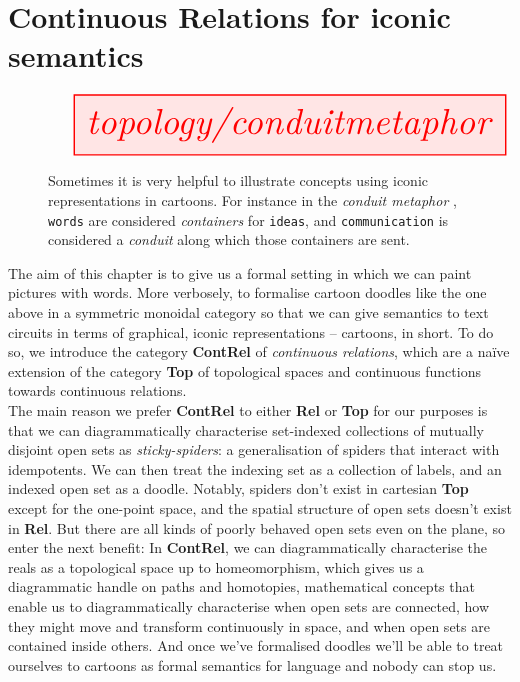 \section{Continuous Relations for iconic semantics}\label{sec:contrelintro}

\begin{figure}[h!]
\centering
\[\resizebox{\textwidth}{!}{\tikzfig{topology/conduitmetaphor}}\]
\caption{Sometimes it is very helpful to illustrate concepts using iconic representations in cartoons. For instance in the \emph{conduit metaphor} \citep{reddyConduitMetaphorCase}, \texttt{words} are considered \emph{containers} for \texttt{ideas}, and \texttt{communication} is considered a \emph{conduit} along which those containers are sent.}
\end{figure}

The aim of this chapter is to give us a formal setting in which we can paint pictures with words. More verbosely, to formalise cartoon doodles like the one above in a symmetric monoidal category so that we can give semantics to text circuits in terms of graphical, iconic representations -- cartoons, in short. To do so, we introduce the category \textbf{ContRel} of \emph{continuous relations}, which are a na\"{i}ve extension of the category \textbf{Top} of topological spaces and continuous functions towards continuous relations.\\

The main reason we prefer \textbf{ContRel} to either \textbf{Rel} or \textbf{Top} for our purposes is that we can diagrammatically characterise set-indexed collections of mutually disjoint open sets as \emph{sticky-spiders}: a generalisation of spiders that interact with idempotents. We can then treat the indexing set as a collection of labels, and an indexed open set as a doodle. Notably, spiders don't exist in cartesian \textbf{Top} except for the one-point space, and the spatial structure of open sets doesn't exist in \textbf{Rel}. But there are all kinds of poorly behaved open sets even on the plane, so enter the next benefit: In \textbf{ContRel}, we can diagrammatically characterise the reals as a topological space up to homeomorphism, which gives us a diagrammatic handle on paths and homotopies, mathematical concepts that enable us to diagrammatically characterise when open sets are connected, how they might move and transform continuously in space, and when open sets are contained inside others. And once we've formalised doodles we'll be able to treat ourselves to cartoons as formal semantics for language and nobody can stop us.

